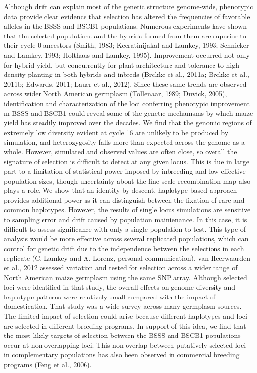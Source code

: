 	Although drift can explain most of the genetic structure genome-wide, phenotypic data provide clear evidence that selection has altered the frequencies of favorable alleles in the BSSS and BSCB1 populations. Numerous experiments have shown that the selected populations and the hybrids formed from them are superior to their cycle 0 ancestors (Smith, 1983; Keeratinijakal and Lamkey, 1993; Schnicker and Lamkey, 1993; Holthaus and Lamkey, 1995). Improvement occurred not only for hybrid yield, but concurrently for plant architecture and tolerance to high-density planting in both hybrids and inbreds (Brekke et al., 2011a; Brekke et al., 2011b; Edwards, 2011; Lauer et al., 2012). Since these same trends are observed across wider North American germplasm (Tollenaar, 1989; Duvick, 2005), identification and characterization of the loci conferring phenotypic improvement in BSSS and BSCB1 could reveal some of the genetic mechanisms by which maize yield has steadily improved over the decades. We find that the genomic regions of extremely low diversity evident at cycle 16 are unlikely to be produced by simulation, and heterozygosity falls more than expected across the genome as a whole.  However, simulated and observed values are often close, so overall the signature of selection is difficult to detect at any given locus. This is due in large part to a limitation of statistical power imposed by inbreeding and low effective population sizes, though uncertainty about the fine-scale recombination map also plays a role. We show that an identity-by-descent, haplotype based approach provides additional power as it can distinguish between the fixation of rare and common haplotypes. However, the results of single locus simulations are sensitive to sampling error and drift caused by population maintenance. In this case, it is difficult to assess significance with only a single population to test. This type of analysis would be more effective across several replicated populations, which can control for genetic drift due to the independence between the selections in each replicate (C. Lamkey and A. Lorenz, personal communication). 
	van Heerwaarden et al., 2012 assessed variation and tested for selection across a wider range of North American maize germplasm using the same SNP array. Although selected loci were identified in that study, the overall effects on genome diversity and haplotype patterns were relatively small compared with the impact of domestication. That study was a wide survey across many germplasm sources. The limited impact of selection could arise because different haplotypes and loci are selected in different breeding programs. In support of this idea, we find that the most likely targets of selection between the BSSS and BSCB1 populations occur at non-overlapping loci. This non-overlap between putatively selected loci in complementary populations has also been observed in commercial breeding programs (Feng et al., 2006).
